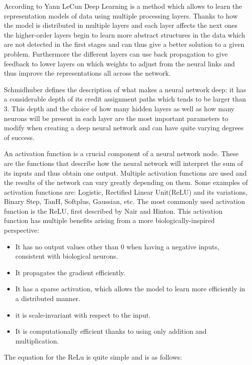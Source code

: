 According to Yann LeCun\cite{LeCun2015} Deep Learning is a method which allows to learn the representation models of data using multiple processing layers. Thanks to how the model is distributed in multiple layers and each layer affects the next ones the higher-order layers begin to learn more abstract structures in the data which are not detected in the first stages and can thus give a better solution to a given problem. Furthermore the different layers can use back propagation to give feedback to lower layers on which weights to adjust from the neural links and thus improve the representations all across the network. 

Schmidhuber defines\cite{Schmidhuber2015} the description of what makes a neural network deep: it has a considerable depth of its credit assignment paths which tends to be larger than 3. This depth and the choice of how many hidden layers as well as how many neurons will be present in each layer are the most important parameters to modify when creating a deep neural network and can have quite varying degrees of success. 

An activation function is a crucial component of a neural network node. These are the functions that describe how the neural network will interpret the sum of its inputs and thus obtain one output. Multiple activation functions are used and the results of the network can vary greatly depending on them. Some examples of activation functions are: Logistic, Rectified Linear Unit(ReLU) and its variations, Binary Step, TanH, Softplus, Gaussian, etc. The most commonly used activation function is the ReLU, first described by Nair and Hinton\cite{Nair:2010:RLU:3104322.3104425}. This activation function has multiple benefits arising from a more biologically-inspired perspective:

\begin{itemize}
	\item It has no output values other than 0 when having a negative inputs, consistent with biological neurons. 
	\item It propagates the gradient efficiently.
	\item It has a sparse activation, which allows the model to learn more efficiently in a distributed manner. 
	\item it is scale-invariant with respect to the input.
	\item It is computationally efficient thanks to using only addition and multiplication.
\end{itemize}
\newpage
The equation for the ReLu is quite simple and is as follows:

